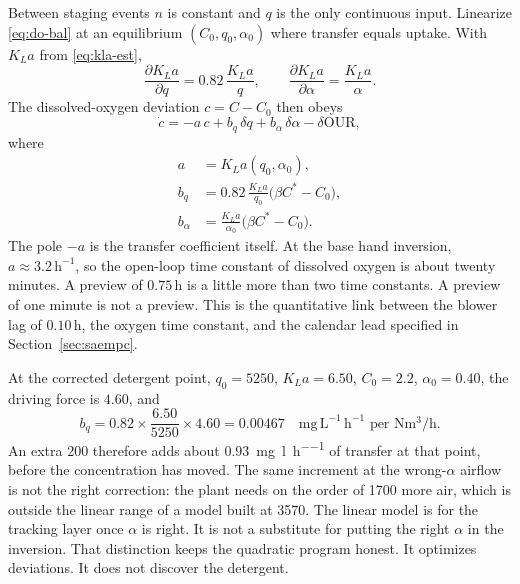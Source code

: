 Between staging events $n$ is constant and $q$ is the only continuous input. Linearize \eqref{eq:do-bal} at an equilibrium $(C_{0},q_{0},\alpha_{0})$ where transfer equals uptake. With $K_La$ from \eqref{eq:kla-est},
\begin{equation}
\label{eq:klin}
\frac{\partial K_La}{\partial q}
=
0.82\,
\frac{K_La}{q},
\qquad
\frac{\partial K_La}{\partial \alpha}
=
\frac{K_La}{\alpha}.
\end{equation}
The dissolved-oxygen deviation $c=C-C_{0}$ then obeys
\begin{equation}
\label{eq:clin}
\dot{c}
=
-a\,c
+
b_{q}\,\delta q
+
b_{\alpha}\,\delta\alpha
-
\delta\mathrm{OUR},
\end{equation}
where
\begin{align}
a
&=
K_La(q_{0},\alpha_{0}),
\\
b_{q}
&=
0.82\,
\frac{K_La}{q_{0}}
\big(\beta C^{*}-C_{0}\big),
\\
b_{\alpha}
&=
\frac{K_La}{\alpha_{0}}
\big(\beta C^{*}-C_{0}\big).
\end{align}
The pole $-a$ is the transfer coefficient itself. At the base hand inversion, $a\approx 3.2\,\mathrm{h^{-1}}$, so the open-loop time constant of dissolved oxygen is about twenty minutes. A preview of $0.75\,\mathrm{h}$ is a little more than two time constants. A preview of one minute is not a preview. This is the quantitative link between the blower lag of $0.10\,\mathrm{h}$, the oxygen time constant, and the calendar lead specified in Section~\ref{sec:saempc}.

At the corrected detergent point, $q_{0}=5250$, $K_La=6.50$, $C_{0}=2.2$, $\alpha_{0}=0.40$, the driving force is $4.60$, and
\begin{equation}
b_{q}
=
0.82\times
\frac{6.50}{5250}
\times
4.60
=
0.00467
\quad
\mathrm{mg\,L^{-1}\,h^{-1}}
\text{ per }
\mathrm{Nm^{3}/h}.
\end{equation}
An extra \SI{200}{\nmcph} therefore adds about \SI{0.93}{\milli\gram\per\litre\per\hour} of transfer at that point, before the concentration has moved. The same increment at the wrong-$\alpha$ airflow is not the right correction: the plant needs on the order of \SI{1700}{\nmcph} more air, which is outside the linear range of a model built at \SI{3570}{\nmcph}. The linear model is for the tracking layer once $\alpha$ is right. It is not a substitute for putting the right $\alpha$ in the inversion. That distinction keeps the quadratic program honest. It optimizes deviations. It does not discover the detergent.

